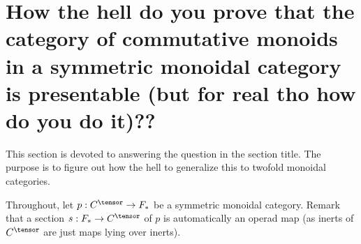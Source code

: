 \section{How the hell do you prove that the category of commutative monoids in a symmetric monoidal category is presentable (but for real tho how do you do it)??}
This section is devoted to answering the question in the section title. The purpose is to figure out how the hell to generalize this to twofold monoidal categories.

Throughout, let $p:C^\tensor\rightarrow F_*$ be a symmetric monoidal category. Remark that a section $s:F_*\rightarrow C^\tensor$ of $p$ is automatically an operad map (as inerts of $C^\tensor$ are just maps lying over inerts). 

